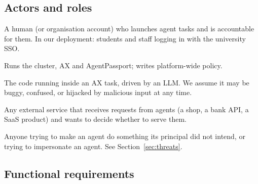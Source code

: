 \subsection{Actors and roles}

\begin{description}[leftmargin=0pt,labelindent=0pt]
  \item[Principal] A human (or organisation account) who launches agent tasks and is accountable for them. In our deployment: students and staff logging in with the university SSO.
  \item[Platform operator] Runs the cluster, AX and AgentPassport; writes platform-wide policy.
  \item[Agent] The code running inside an AX task, driven by an LLM. We assume it may be buggy, confused, or hijacked by malicious input at any time.
  \item[Relying party] Any external service that receives requests from agents (a shop, a bank API, a SaaS product) and wants to decide whether to serve them.
  \item[Attacker] Anyone trying to make an agent do something its principal did not intend, or trying to impersonate an agent. See Section~\ref{sec:threats}.
\end{description}

\subsection{Functional requirements}

